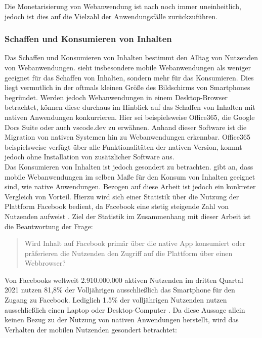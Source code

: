\documentclass[a4paper]{scrartcl}
\begin{document}
Die Monetarisierung von Webanwendung ist nach \textcite[28]{Jobe} noch immer uneinheitlich, jedoch ist dies auf die Vielzahl der Anwendungsfälle zurückzuführen.

\subsubsection{Schaffen und Konsumieren von Inhalten}

Das Schaffen und Konsumieren von Inhalten bestimmt den Alltag von Nutzenden von Webanwendungen. \textcite[28]{Jobe} sieht insbesondere mobile Webanwendungen als weniger geeignet für das Schaffen von Inhalten, sondern mehr für das Konsumieren. Dies liegt vermutlich in der oftmals kleinen Größe des Bildschirms von Smartphones begründet. Werden jedoch Webanwendungen in einem Desktop-Browser betrachtet, können diese durchaus im Hinblick auf das Schaffen von Inhalten mit nativen Anwendungen konkurrieren. Hier sei beispielsweise Office365, die Google Docs Suite oder auch vscode.dev zu erwähnen. Anhand dieser Software ist die Migration von nativen Systemen hin zu Webanwendungen erkennbar. Office365 beispielsweise verfügt über alle Funktionalitäten der nativen Version, kommt jedoch ohne Installation von zusätzlicher Software aus. \\

Das Konsumieren von Inhalten ist jedoch gesondert zu betrachten. \textcite[28]{Jobe} gibt an, dass mobile Webanwendungen im selben Maße für den Konsum von Inhalten geeignet sind, wie native Anwendungen. Bezogen auf diese Arbeit ist jedoch ein konkreter Vergleich von Vorteil. Hierzu wird sich einer Statistik über die Nutzung der Plattform Facebook bedient, da Facebook eine stetig steigende Zahl von Nutzenden aufweist \autocite{Statista_Facebook}. Ziel der Statistik im Zusammenhang mit dieser Arbeit ist die Beantwortung der Frage: 
\begin{quote}
	Wird Inhalt auf Facebook primär über die native App konsumiert oder präferieren die Nutzenden den Zugriff auf die Plattform über einen Webbrowser?
\end{quote}

Von Facebooks weltweit 2.910.000.000 aktiven Nutzenden im dritten Quartal 2021 \textcite{Statista_Facebook} nutzen 81,8\% der Volljährigen ausschließlich das Smartphone für den Zugang zu Facebook. Lediglich 1.5\% der volljährigen Nutzenden nutzen ausschließlich einen Laptop oder Desktop-Computer \autocite{Kemp_Facebook}. Da diese Aussage allein keinen Bezug zu der Nutzung von nativen Anwendungen herstellt, wird das Verhalten der mobilen Nutzenden gesondert betrachtet: 
\end{document}
